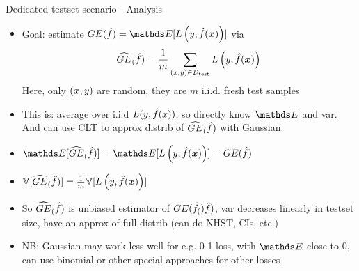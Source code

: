 \begin{frame}{Dedicated testset scenario - Analysis}
\begin{itemize}
\item Goal: estimate $GE(\fh) = \E[\Lyfhx]$ via
$$\widehat{GE}_{(}\hat{f}) = \frac{1}{m} \sum_{(x, y) \in \mathcal{D}_{\text{test}}} L\left(y, \hat{f}(\bm{x})\right) $$
Here, only $(\bm{x},y)$ are random, they are $m$ i.i.d. fresh test samples


\item This is: average over i.i.d $L(y, \hat{f}(x))$,
    so directly know $\E$ and var. And can use CLT to approx distrib of $\widehat{GE}_{(}\hat{f})$ with Gaussian.

\item $\E[\GEh(\fh)] = \E[\Lyfhx] = GE(\fh) $

\item $\mathbb{V}[\widehat{GE}_{(}\hat{f})] = \frac{1}{m} \mathbb{V}[L\left(y, \hat{f}(\bm{x})\right)]$ 

\item So $\widehat{GE}_{(}\hat{f})$ is unbiased estimator of $GE(\hat{f}_{(})\hat{f})$, var decreases linearly in testset size, have an approx of full distrib (can do NHST, CIs, etc.)
\item NB: Gaussian may work less well for e.g. 0-1 loss, with $\E$ close to 0, can use binomial or other special approaches for other losses

\end{itemize}
\end{frame}

